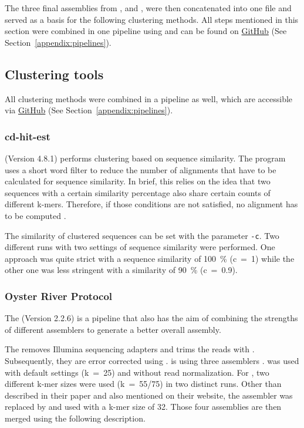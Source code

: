 \documentclass[12pt,a4paper,english]{article}
\begin{document}
	\noindent
	The three final assemblies from \spades, \soap and \trinity, were then concatenated into one file and served as a basis for the following clustering methods. All steps mentioned in this section were combined in one pipeline using \snakemake \citep{Snakemake:12} and can be found on \href{https://github.com/lmfaber/multi_assembly}{GitHub} (See Section~\ref{appendix:pipelines}).

\subsection{Clustering tools}
    All clustering methods were combined in a \snakemake pipeline as well, which are accessible via \href{https://github.com/lmfaber/clustering}{GitHub} (See Section~\ref{appendix:pipelines}).
	
\subsubsection*{cd-hit-est}
	\cdhit (Version 4.8.1) \citep{cd-hit:06, cd-hit:12} performs clustering based on sequence similarity. The program uses a short word filter to reduce the number of alignments that have to be calculated for sequence similarity. In brief, this relies on the idea that two sequences with a certain similarity percentage also share certain counts of different k-mers. Therefore, if those conditions are not satisfied, no alignment has to be computed \citep{cd-hit:01}.
	
	The similarity of clustered sequences can be set with the parameter \texttt{-c}. Two different runs with two settings of sequence similarity were performed. One approach was quite strict with a sequence similarity of 100~\% (c~=~1) while the other one was less stringent with a similarity of 90~\% (c~=~0.9).

\subsubsection*{Oyster River Protocol}
	The \orp (Version 2.2.6) \citep{OysterRiverProtocol:18} is a pipeline that also has the aim of combining the strengths of different assemblers to generate a better overall assembly.
	
	The \orp removes Illumina sequencing adapters and trims the reads with \trim \citep{Trimmomatic:14}. Subsequently, they are error corrected using \rcorrector \citep{RCorrector:15}.
	\citeauthor{OysterRiverProtocol:18} is using three assemblers \citep{OysterRiverProtocol:18}. \trinity was used with default settings (k~=~25) and without read normalization. For \spades, two different k-mer sizes were used (k~=~55/75) in two distinct runs. Other than described in their paper and also mentioned on their website, the assembler \shannon \citep{Shannon:16} was replaced by \transabyss \citep{Trans-ABySS:10} and used with a k-mer size of 32. Those four assemblies are then merged using the following description.
	
\end{document}
